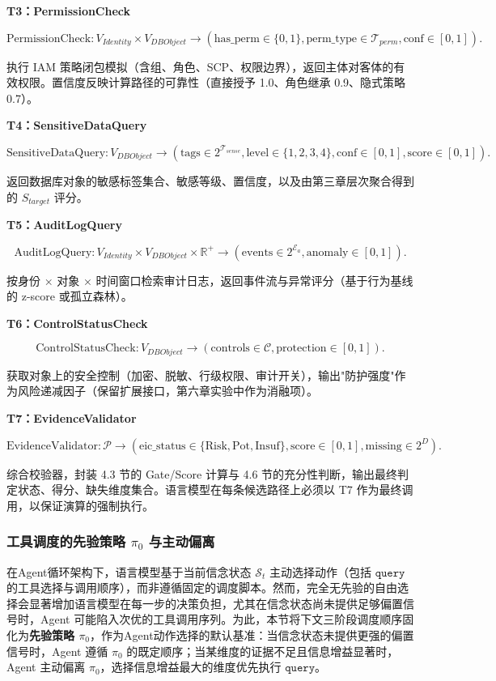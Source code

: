 \documentclass[a4paper,12pt]{ctexart}
\begin{document}
\textbf{T3：PermissionCheck}

\[
\text{PermissionCheck}: V_{Identity} \times V_{DBObject} \to (\text{has\_perm} \in \{0,1\}, \text{perm\_type} \in \mathcal{T}_{perm}, \text{conf} \in [0,1]).
\]

执行 IAM 策略闭包模拟（含组、角色、SCP、权限边界），返回主体对客体的有效权限。置信度反映计算路径的可靠性（直接授予 1.0、角色继承 0.9、隐式策略 0.7）。

\textbf{T4：SensitiveDataQuery}

\[
\text{SensitiveDataQuery}: V_{DBObject} \to (\text{tags} \in 2^{\mathcal{T}_{sense}}, \text{level} \in \{1,2,3,4\}, \text{conf} \in [0,1], \text{score} \in [0,1]).
\]

返回数据库对象的敏感标签集合、敏感等级、置信度，以及由第三章层次聚合得到的 $S_{target}$ 评分。

\textbf{T5：AuditLogQuery}

\[
\text{AuditLogQuery}: V_{Identity} \times V_{DBObject} \times \mathbb{R}^+ \to (\text{events} \in 2^{\mathcal{E}_a}, \text{anomaly} \in [0,1]).
\]

按身份 × 对象 × 时间窗口检索审计日志，返回事件流与异常评分（基于行为基线的 z-score 或孤立森林）。

\textbf{T6：ControlStatusCheck}

\[
\text{ControlStatusCheck}: V_{DBObject} \to (\text{controls} \in \mathcal{C}, \text{protection} \in [0,1]).
\]

获取对象上的安全控制（加密、脱敏、行级权限、审计开关），输出"防护强度"作为风险递减因子（保留扩展接口，第六章实验中作为消融项）。

\textbf{T7：EvidenceValidator}

\[
\text{EvidenceValidator}: \mathcal{P} \to (\text{eic\_status} \in \{\text{Risk}, \text{Pot}, \text{Insuf}\}, \text{score} \in [0,1], \text{missing} \in 2^D).
\]

综合校验器，封装 4.3 节的 Gate/Score 计算与 4.6 节的充分性判断，输出最终判定状态、得分、缺失维度集合。语言模型在每条候选路径上必须以 T7 作为最终调用，以保证演算的强制执行。

\subsubsection{工具调度的先验策略 $\pi_0$ 与主动偏离}

在Agent循环架构下，语言模型基于当前信念状态 $\mathcal{S}_t$ 主动选择动作（包括 $\texttt{query}$ 的工具选择与调用顺序），而非遵循固定的调度脚本。然而，完全无先验的自由选择会显著增加语言模型在每一步的决策负担，尤其在信念状态尚未提供足够偏置信号时，Agent 可能陷入次优的工具调用序列。为此，本节将下文三阶段调度顺序固化为\textbf{先验策略 $\pi_0$}，作为Agent动作选择的默认基准：当信念状态未提供更强的偏置信号时，Agent 遵循 $\pi_0$ 的既定顺序；当某维度的证据不足且信息增益显著时，Agent 主动偏离 $\pi_0$，选择信息增益最大的维度优先执行 $\texttt{query}$。
\end{document}
